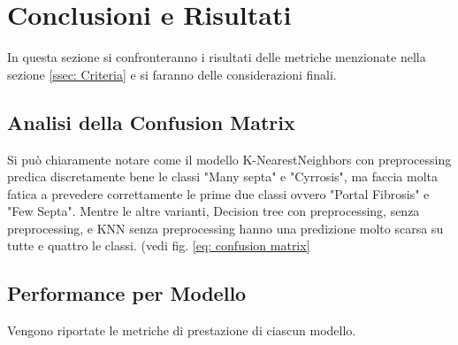 \section{Conclusioni e Risultati}
In questa sezione si confronteranno i risultati delle metriche menzionate nella sezione \ref{ssec: Criteria} e si faranno delle considerazioni finali.
\subsection{Analisi della Confusion Matrix}

Si può chiaramente notare come il modello K-NearestNeighbors con preprocessing predica discretamente bene le classi  "Many septa" e "Cyrrosis", ma faccia molta fatica a prevedere correttamente le prime due classi ovvero "Portal Fibrosis"  e "Few Septa". Mentre le altre varianti, Decision tree con preprocessing, senza preprocessing, e KNN senza preprocessing hanno una predizione molto scarsa su tutte e quattro le classi. (vedi fig. \ref{eq: confusion matrix}
\clearpage
\subsection{Performance per Modello}

Vengono riportate le metriche di prestazione di ciascun modello.

